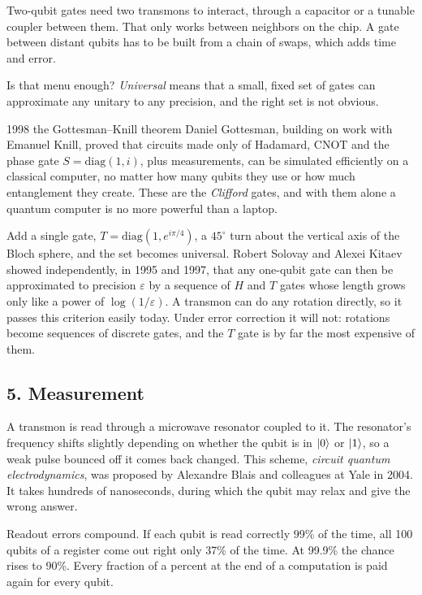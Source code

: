 Two-qubit gates need two transmons to interact, through a capacitor or a tunable coupler
between them. That only works between neighbors on the chip. A gate between distant
qubits has to be built from a chain of swaps, which adds time and error.

Is that menu enough? \emph{Universal} means that a small, fixed set of gates can
approximate any unitary to any precision, and the right set is not obvious.

\begin{history}{1998 \textperiodcentered{} the Gottesman--Knill theorem}
Daniel Gottesman, building on work with Emanuel Knill, proved that circuits made only of
Hadamard, CNOT and the phase gate $S = \mathrm{diag}(1, i)$, plus measurements, can be
simulated efficiently on a classical computer, no matter how many qubits they use or how
much entanglement they create. These are the \emph{Clifford} gates, and with them alone a
quantum computer is no more powerful than a laptop.
\end{history}

Add a single gate, $T = \mathrm{diag}(1, e^{i\pi/4})$, a $45^\circ$ turn about the vertical
axis of the Bloch sphere, and the set becomes universal. Robert Solovay and Alexei Kitaev
showed independently, in 1995 and 1997, that any one-qubit gate can then be approximated
to precision $\varepsilon$ by a sequence of $H$ and $T$ gates whose length grows only like
a power of $\log(1/\varepsilon)$. A transmon can do any rotation directly, so it passes this
criterion easily today. Under error correction it will not: rotations become sequences of
discrete gates, and the $T$ gate is by far the most expensive of them.

\subsection*{5. Measurement}

A transmon is read through a microwave resonator coupled to it. The resonator's frequency
shifts slightly depending on whether the qubit is in $\ket0$ or $\ket1$, so a weak pulse
bounced off it comes back changed. This scheme, \emph{circuit quantum electrodynamics},
was proposed by Alexandre Blais and colleagues at Yale in 2004. It takes hundreds of
nanoseconds, during which the qubit may relax and give the wrong answer.

Readout errors compound. If each qubit is read correctly 99\% of the time, all 100 qubits
of a register come out right only 37\% of the time. At 99.9\% the chance rises to 90\%.
Every fraction of a percent at the end of a computation is paid again for every qubit.

